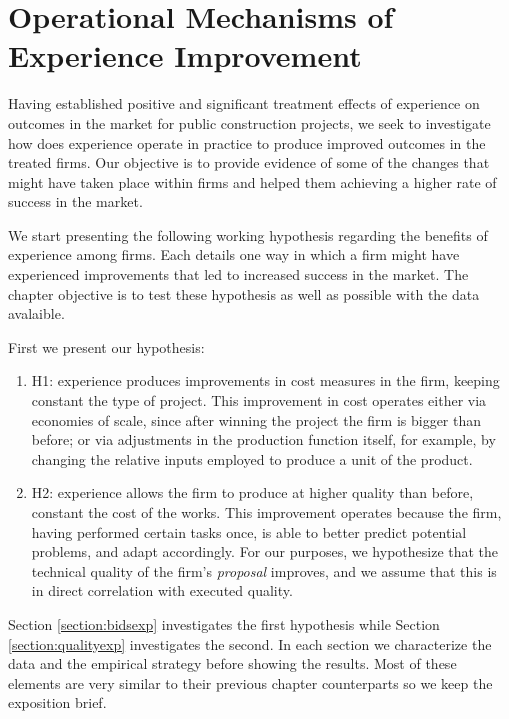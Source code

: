 \chapter{Operational Mechanisms of Experience Improvement}
Having established positive and significant treatment effects of  experience on outcomes in the market for public construction projects, we seek to investigate how does experience operate in practice to produce improved outcomes in the treated firms. Our objective is to provide evidence of some of the changes that might have taken place within firms and helped them achieving a higher rate of success in the market.

We start presenting the following working hypothesis regarding the benefits of experience among firms. Each details one way in which a firm might have experienced improvements that led to increased success in the market. The chapter objective is to test these hypothesis as well as possible with the data avalaible.

First we present our hypothesis:
\begin{enumerate}
  \item{H1}: experience produces improvements in cost measures in the firm, keeping constant the type of project. This improvement in cost operates either via economies of scale, since after winning the project the firm is bigger than before; or via adjustments in the production function itself, for example, by changing the relative inputs employed to produce a unit of the product.
  \item{H2}: experience allows the firm to produce at higher quality than before, constant the cost of the works. This improvement operates because the firm, having performed certain tasks once, is able to better predict potential problems, and adapt accordingly. For our purposes, we hypothesize that the technical quality of the firm's \textit{proposal} improves, and we assume that this is in direct correlation with executed quality.
\end{enumerate}

Section \ref{section:bidsexp} investigates the first hypothesis while Section \ref{section:qualityexp} investigates the second. In each section we characterize the data and the empirical strategy before showing the results. Most of these elements are very similar to their previous chapter counterparts so we keep the exposition brief.


